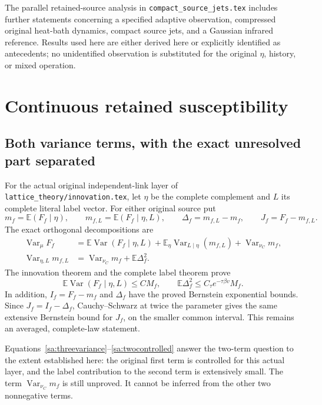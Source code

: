 \documentclass[11pt]{article}
\theoremstyle{definition}\newtheorem{definition}[theorem]{Definition}
\theoremstyle{remark}\newtheorem{remark}[theorem]{Remark}
\newcommand{\E}{\mathbb E}\newcommand{\Var}{\operatorname{Var}}
\begin{document}
The parallel retained-source analysis in \texttt{compact\_source\_jets.tex} includes further statements concerning a specified adaptive observation, compressed original heat-bath dynamics, compact source jets, and a Gaussian infrared reference. Results used here are either derived here or explicitly identified as antecedents; no unidentified observation is substituted for the original \(\eta\), history, or mixed operation.


\section{Continuous retained susceptibility}
\label{sec:r18status}

\subsection{Both variance terms, with the exact unresolved part separated}

For the actual original independent-link layer of \texttt{lattice\_theory/innovation.tex}, let $\eta$ be the complete complement and $L$ its complete literal label vector. For either original source put
\[
 m_f=\E(F_f\mid\eta),\qquad
 m_{f,L}=\E(F_f\mid\eta,L),\qquad
 \Delta_f=m_{f,L}-m_f,\qquad
 J_f=F_f-m_{f,L}.
\]
The exact orthogonal decompositions are
\begin{align}
 \Var_\mu F_f
 &=\E\Var(F_f\mid\eta,L)
       +\E_\eta\Var_{L\mid\eta}(m_{f,L})
       +\Var_{\nu_C}m_f, \label{sa:threevariance}\\
 \Var_{\eta,L}m_{f,L}
 &=\Var_{\nu_C}m_f+\E\Delta_f^2. \label{sa:meanvariance}
\end{align}
The innovation theorem and the complete label theorem prove
\begin{equation}
 \E\Var(F_f\mid\eta,L)\le CM_f,\qquad
 \E\Delta_f^2\le C_\tau e^{-\tau\beta v}M_f.
 \label{sa:twocontrolled}
\end{equation}
In addition, $I_f=F_f-m_f$ and $\Delta_f$ have the proved Bernstein exponential bounds. Since $J_f=I_f-\Delta_f$, Cauchy--Schwarz at twice the parameter gives the same extensive Bernstein bound for $J_f$, on the smaller common interval. This remains an averaged, complete-law statement.

Equations~\eqref{sa:threevariance}--\eqref{sa:twocontrolled} answer the two-term question to the extent established here: the original first term is controlled for this actual layer, and the label contribution to the second term is extensively small. The term $\Var_{\nu_C}m_f$ is still unproved. It cannot be inferred from the other two nonnegative terms.
\end{document}

